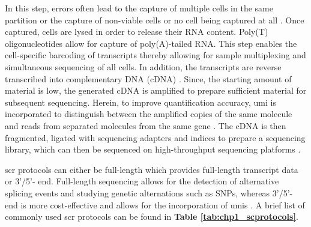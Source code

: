 In this step, errors often lead to the capture of multiple cells in the same partition or the capture of non-viable cells or no cell being captured at all \textbf{\cite{svensson_exponential_2018}}. Once captured, cells are lysed in order to release their RNA content. Poly(T) oligonucleotides allow for capture of poly(A)-tailed RNA. This step enables the cell-specific barcoding of transcripts thereby allowing for sample multiplexing and simultaneous sequencing of all cells. In addition, the transcripts are reverse transcribed into complementary DNA (cDNA) \textbf{\cite{svensson_exponential_2018,haque_practical_2017}}. Since, the starting amount of material is low, the generated cDNA is amplified to prepare sufficient material for subsequent sequencing. Herein, to improve quantification accuracy, \gls{umi} is incorporated to distinguish between the amplified copies of the same  molecule and reads from separated  molecules from the same gene \textbf{\cite{haque_practical_2017}}. The cDNA is then fragmented, ligated with sequencing adapters and indices to prepare a sequencing library, which can then be sequenced on high-throughput sequencing platforms \textbf{\cite{svensson_exponential_2018,haque_practical_2017}}.\\
\par \gls{scr} protocols can either be full-length which provides full-length transcript data or 3'/5'- end. Full-length sequencing allows for the detection of alternative splicing events and studying genetic alternations such as SNPs, whereas 3'/5'- end is more cost-effective and allows for the incorporation of \glspl{umi} \textbf{\cite{baran-gale_experimental_2018}}. A brief list of commonly used \gls{scr} protocols can be found in \textbf{Table \ref{tab:chp1_scprotocols}}.

